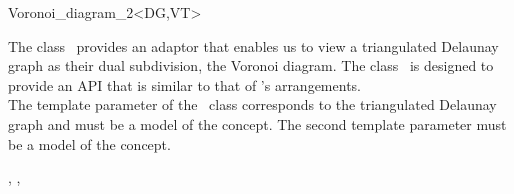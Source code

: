 

\begin{ccRefClass}{Voronoi_diagram_2<DG,VT>}


\ccDefinition

The class \ccRefName\ provides an adaptor that enables us
to view a triangulated Delaunay graph as their dual subdivision, the
Voronoi diagram. The class \ccRefName\ is designed to provide an API
that is similar to that of \cgal's arrangements.\\
The template parameter of the \ccRefName\ class corresponds to the
triangulated Delaunay graph and must be a model of the
 concept. The second template parameter must be a
model of the  concept.


\ccRefines
{}, , 


\end{ccRefClass}
